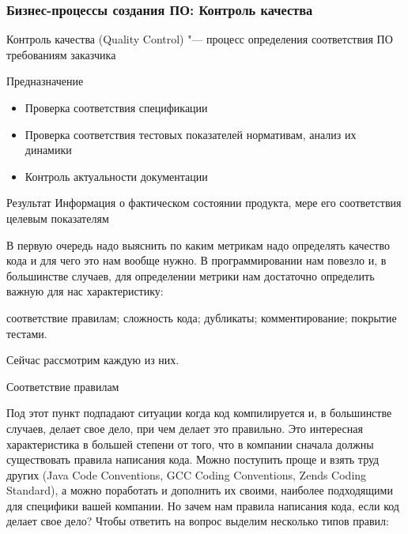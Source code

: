 \documentclass{../industrial-development}
\begin{document}
\begin{frame} \frametitle{Бизнес-процессы создания ПО: Контроль качества}
	\begin{block}{}
		\alert{Контроль качества} (Quality Control) "--- процесс определения соответствия ПО требованиям заказчика
	\end{block}
	\begin{block}{Предназначение}
		\begin{itemize}
			\item Проверка соответствия спецификации
			\item Проверка соответствия тестовых показателей нормативам, анализ их динамики
			\item Контроль актуальности документации
		\end{itemize}
	\end{block}
	\begin{block}{Результат}
		Информация о фактическом состоянии продукта, мере его соответствия целевым показателям
	\end{block}
\end{frame}
\lecturenotes

В первую очередь надо выяснить по каким метрикам надо определять качество кода и для чего это нам вообще нужно. В программировании нам повезло и, в большинстве случаев, для определении метрики нам достаточно определить важную для нас характеристику:

соответствие правилам;
сложность кода;
дубликаты;
комментирование;
покрытие тестами.


Сейчас рассмотрим каждую из них.

Соответствие правилам

Под этот пункт подпадают ситуации когда код компилируется и, в большинстве случаев, делает свое дело, при чем делает это правильно. Это интересная характеристика в большей степени от того, что в компании сначала должны существовать правила написания кода. Можно поступить проще и взять труд других (Java Code Conventions, GCC Coding Conventions, Zends Coding Standard), а можно поработать и дополнить их своими, наиболее подходящими для специфики вашей компании.
Но зачем нам правила написания кода, если код делает свое дело? Чтобы ответить на вопрос выделим несколько типов правил:
\end{document}
